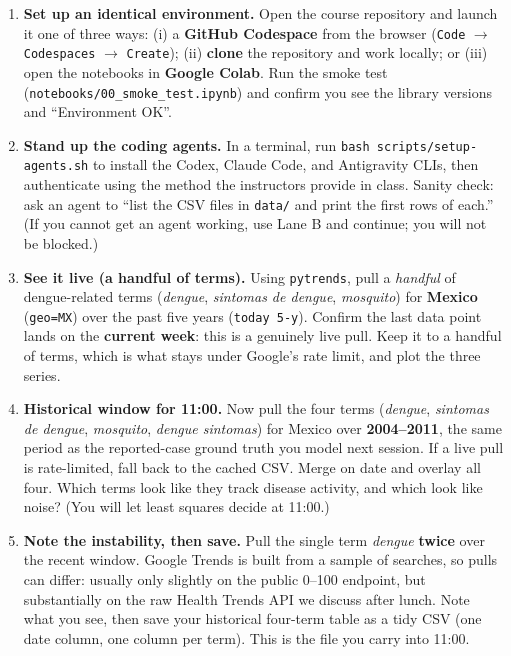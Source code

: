 \documentclass[11pt]{article}
\begin{document}
\begin{enumerate}[label=(\alph*)]
  \item \textbf{Set up an identical environment.} Open the course repository and launch
        it one of three ways: (i) a \textbf{GitHub Codespace} from the browser
        (\texttt{Code} $\rightarrow$ \texttt{Codespaces} $\rightarrow$ \texttt{Create});
        (ii) \textbf{clone} the repository and work locally; or (iii) open the notebooks
        in \textbf{Google Colab}. Run the smoke test
        (\texttt{notebooks/00\_smoke\_test.ipynb}) and confirm you see the library
        versions and ``Environment OK''.

  \item \textbf{Stand up the coding agents.} In a terminal, run
        \texttt{bash scripts/setup-agents.sh} to install the Codex, Claude Code, and Antigravity
        CLIs, then authenticate using the method the instructors provide in class. Sanity
        check: ask an agent to ``list the CSV files in \texttt{data/} and print the first
        rows of each.'' (If you cannot get an agent working, use Lane B and continue; you
        will not be blocked.)

  \item \textbf{See it live (a handful of terms).} Using \texttt{pytrends}, pull a
        \emph{handful} of dengue-related terms (\emph{dengue}, \emph{sintomas de dengue},
        \emph{mosquito}) for \textbf{Mexico} (\texttt{geo=MX}) over the past five years
        (\texttt{today 5-y}). Confirm the last data point lands on the \textbf{current
        week}: this is a genuinely live pull. Keep it to a handful of terms, which is what
        stays under Google's rate limit, and plot the three series.

  \item \textbf{Historical window for 11:00.} Now pull the four terms (\emph{dengue},
        \emph{sintomas de dengue}, \emph{mosquito}, \emph{dengue sintomas}) for Mexico over
        \textbf{2004--2011}, the same period as the reported-case ground truth you model
        next session. If a live pull is rate-limited, fall back to the cached CSV. Merge on
        date and overlay all four. Which terms look like they track disease activity, and
        which look like noise? (You will let least squares decide at 11:00.)

  \item \textbf{Note the instability, then save.} Pull the single term \emph{dengue}
        \textbf{twice} over the recent window. Google Trends is built from a sample of
        searches, so pulls can differ: usually only slightly on the public 0--100 endpoint,
        but substantially on the raw Health Trends API we discuss after lunch. Note what you
        see, then save your historical four-term table as a tidy CSV (one date column, one
        column per term). This is the file you carry into 11:00.


\end{enumerate}
\end{document}
